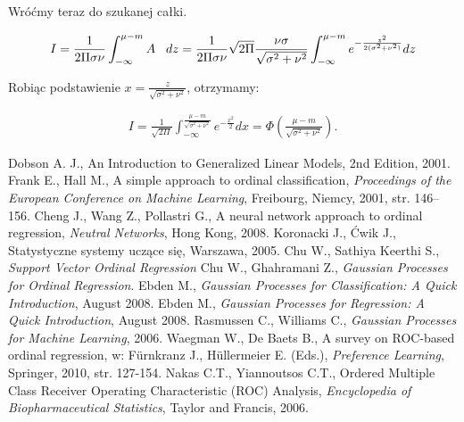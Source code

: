 \documentclass{mini}
\begin{document}
Wróćmy teraz do szukanej całki.

\begin{eqnarray*}
I = 
\frac{1}{2\Pi\sigma\nu} \int_{-\infty}^{\mu-m} A\hspace{3mm} dz
=
\frac{1}{2\Pi\sigma\nu} \sqrt{2\Pi}\frac{\nu\sigma}{\sqrt{\sigma^2+\nu^2}}  \int_{-\infty}^{\mu-m} e^{-\frac{z^2}{2(\sigma^2+\nu^2)}} dz
\end{eqnarray*}

Robiąc podstawienie $x = \frac{z}{\sqrt{\sigma^2+\nu^2}}$, otrzymamy:

\begin{eqnarray*}
I = 
\frac{1}{\sqrt{2\Pi}}\int_{-\infty}^{\frac{\mu-m}{\sqrt{\sigma^2+\nu^2}}} e^{-\frac{x^2}{2}} dx = \Phi \left(   \frac{\mu-m}{\sqrt{\sigma^2+\nu^2}}  \right).
\end{eqnarray*}


\begin{thebibliography}{9}
	 Dobson A. J., An Introduction to Generalized Linear Models, 2nd Edition, 2001.
	 Frank E., Hall M., A simple approach to ordinal classification, \emph{Proceedings of the European Conference on Machine Learning}, Freibourg, Niemcy, 2001, str. 146--156.
	 Cheng J., Wang Z., Pollastri G., A neural network approach to ordinal regression, \emph{Neutral Networks}, Hong Kong, 2008.
	 Koronacki J., Ćwik J., Statystyczne systemy uczące się, Warszawa, 2005. 
	 Chu W., Sathiya Keerthi S., \emph{Support Vector Ordinal Regression}
	 Chu W., Ghahramani Z., \emph{Gaussian Processes for Ordinal Regression}.
	 Ebden M., \emph{Gaussian Processes for Classification: A Quick Introduction}, August 2008.
	 Ebden M., \emph{Gaussian Processes for Regression: A Quick Introduction}, August 2008.
	 Rasmussen C., Williams C., \emph{Gaussian Processes for Machine Learning}, 2006.
	 Waegman W., De Baets B., A survey on ROC-based ordinal regression, w: Fürnkranz J., Hüllermeier E. (Eds.), \emph{Preference Learning}, Springer, 2010, str. 127-154.
	 Nakas C.T., Yiannoutsos C.T., Ordered Multiple Class Receiver Operating Characteristic (ROC) Analysis, \emph{Encyclopedia of Biopharmaceutical Statistics}, Taylor and Francis, 2006.
\end{thebibliography}


\makestatement
\end{document}

